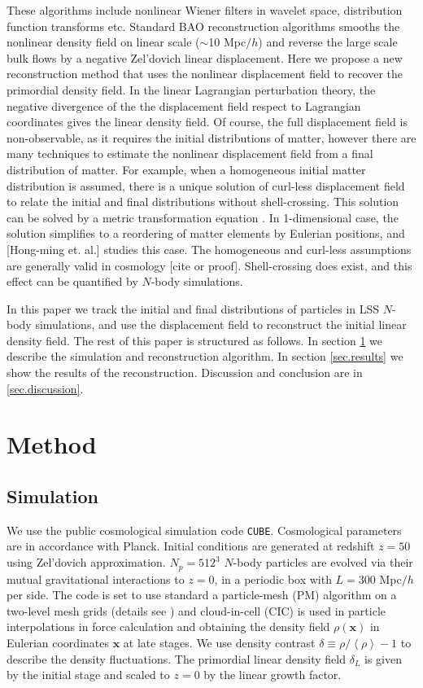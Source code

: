 \documentclass[aps,prd,twocolumn,superscriptaddress,amsfont,amssymb,amsmath,nofootinbib,showpacs,balancelastpage]{revtex4-1}
\newcommand{\bs}{\boldsymbol}
\newcommand{\lb}{\left\langle}
\newcommand{\rb}{\right\rangle}
\begin{document}
These algorithms include nonlinear Wiener filters in wavelet space, distribution function transforms etc. Standard BAO reconstruction algorithms smooths the nonlinear density field on linear scale ($\sim$10 Mpc$/h$) and reverse the large scale bulk flows by a negative Zel'dovich linear displacement. Here we propose a new reconstruction method that uses the nonlinear displacement field to recover the primordial density field. In the linear Lagrangian perturbation theory, the negative divergence of the the displacement field respect to Lagrangian coordinates gives the linear density field. Of course, the full displacement field is non-observable, as it requires the initial distributions of matter, however there are many techniques to estimate the nonlinear displacement field from a final distribution of matter. For example, when a homogeneous initial matter distribution is assumed, there is a unique solution of curl-less displacement field to relate the initial and final distributions without shell-crossing. This solution can be solved by a metric transformation equation \citep{1995ApJS..100..269P,1998ApJS..115...19P}. In 1-dimensional case, the solution simplifies to a reordering of matter elements by Eulerian positions, and [Hong-ming et. al.] studies this case. The homogeneous and curl-less assumptions are generally valid in cosmology [cite or proof]. Shell-crossing does exist, and this effect can be quantified by $N$-body simulations.

In this paper we track the initial and final distributions of particles in LSS $N$-body simulations, and use the displacement field to reconstruct the initial linear density field. The rest of this paper is structured as follows. In section \ref{sec.method} we describe the simulation and reconstruction algorithm. In section \ref{sec.results} we show the results of the reconstruction. Discussion and conclusion are in \ref{sec.discussion}.



\section{Method}\label{sec.method}

\subsection{Simulation}
We use the public cosmological simulation code {\tt CUBE}. Cosmological parameters are in accordance with Planck. Initial conditions are generated at redshift $z=50$ using Zel'dovich approximation. $N_p=512^3$ $N$-body particles are evolved via their mutual gravitational interactions to $z=0$, in a periodic box with $L=300$ Mpc$/h$ per side. The code is set to use standard a particle-mesh (PM) algorithm \cite{1988csup.book.....H} on a two-level mesh grids (details see \cite{2013MNRAS.436..540H}) and cloud-in-cell (CIC) is used in particle interpolations in force calculation and obtaining the density field $\rho({\bs x})$ in Eulerian coordinates ${\bs x}$ at late stages. We use density contrast $\delta\equiv\rho/\lb\rho\rb-1$ to describe the density fluctuations. The primordial linear density field $\delta_L$ is given by the initial stage and scaled to $z=0$ by the linear growth factor. 
\end{document}
